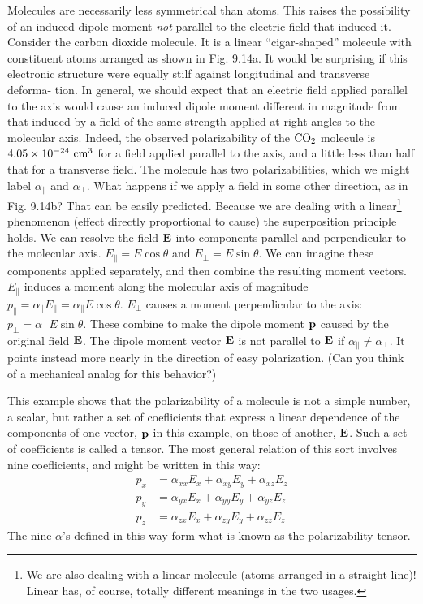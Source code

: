 Molecules are necessarily less symmetrical than atoms. This raises
the possibility of an induced dipole moment \emph{not} parallel to the electric
field that induced it. Consider the carbon dioxide molecule. It is
a linear ``cigar-shaped'' molecule with constituent atoms arranged
as shown in Fig. 9.14a. It would be surprising if this electronic structure
were equally stilf against longitudinal and transverse deforma-
tion. In general, we should expect that an electric field applied
parallel to the axis would cause an induced dipole moment different
in magnitude from that induced by a field of the same strength applied
at right angles to the molecular axis. Indeed, the observed
polarizability of the $\textup{CO}_2$ molecule is $4.05 \times 10^{-24}\ \textup{cm}^3$ for a field
applied parallel to the axis, and a little less than half that for a transverse
field. The molecule has two polarizabilities, which we might
label $\alpha_\parallel$ and $\alpha_\perp$. What happens if we apply a field in some other
direction, as in Fig. 9.14b? That can be easily predicted. Because
we are dealing with a linear\footnote{We
are also dealing with a linear molecule (atoms arranged in a straight line)!
Linear has, of course, totally different meanings in the two usages.}
phenomenon (effect directly proportional
to cause) the superposition principle holds. We can resolve
the field $\mathbf{E}$ into components parallel and perpendicular to the molecular
axis. $E_\parallel = E \cos \theta$ and $E_\perp = E \sin \theta$. We can imagine these
components applied separately, and then combine the resulting
moment vectors. $E_\parallel$ induces a moment along the molecular axis of
magnitude $p_\parallel = \alpha_\parallel E_\parallel = \alpha_\parallel E \cos \theta$.
$E_\perp$ causes a moment perpendicular
to the axis: $p_\perp = \alpha_\perp E \sin \theta$. These combine to make the dipole
moment $\mathbf{p}$ caused by the original field $\mathbf{E}$. The dipole moment
vector $\mathbf{E}$ is not parallel to $\mathbf{E}$ if $\alpha_\parallel\ne \alpha_\perp$. It points instead more nearly
in the direction of easy polarization. (Can you think of a mechanical
analog for this behavior?)

This example shows that the polarizability of a molecule is not a
simple number, a scalar, but rather a set of coeflicients that express
a linear dependence of the components of one vector, $\mathbf{p}$ in this 
example, on those of another, $\mathbf{E}$. Such a set of coefficients is called a
tensor. The most general relation of this sort involves
nine coeflicients, and might be written in this way:
\begin{align}
  p_x &= \alpha_{xx}E_x+\alpha_{xy}E_y+\alpha_{xz}E_z \\
  p_y &= \alpha_{yx}E_x+\alpha_{yy}E_y+\alpha_{yz}E_z \\
  p_z &= \alpha_{zx}E_x+\alpha_{zy}E_y+\alpha_{zz}E_z 
\end{align}
The nine $\alpha$'s defined in this way form what is known as the 
polarizability tensor.

